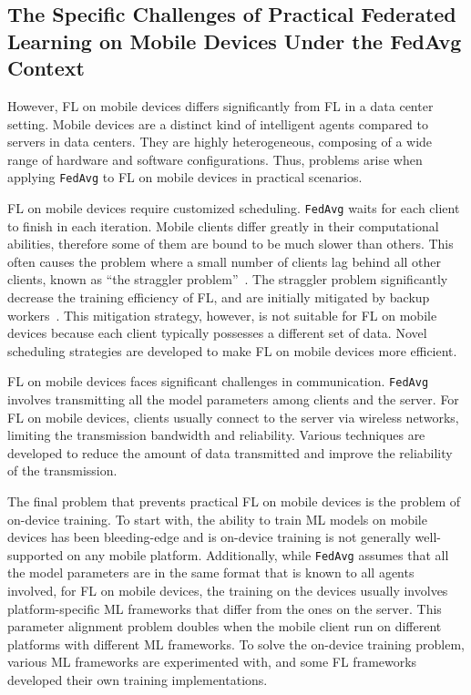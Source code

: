 \documentclass[conference]{IEEEtran}
\begin{document}
\subsection{The Specific Challenges of Practical Federated Learning on
Mobile Devices Under the FedAvg Context}

However, FL on mobile devices differs significantly from
FL in a data center setting.
Mobile devices are a distinct kind of intelligent agents compared to
servers in data centers.
They are highly heterogeneous,
composing of a wide range of hardware and software configurations.
Thus, problems arise when applying \verb|FedAvg| to FL on mobile devices in
practical scenarios.

FL on mobile devices require customized scheduling.
\verb|FedAvg| waits for each client to finish in each iteration.
Mobile clients differ greatly in their computational abilities,
therefore some of them are bound to be much slower than others.
This often causes the problem where
a small number of clients lag behind all other clients,
known as
``the straggler problem''~\cite{chen2020asynchronous,zheng2017asynchronous}.
The straggler problem significantly decrease the training efficiency of FL,
and are initially mitigated by backup workers~\cite{chen2016revisiting}.
This mitigation strategy, however,
is not suitable for FL on mobile devices because
each client typically possesses a different set of data.
Novel scheduling strategies are developed to
make FL on mobile devices more efficient.

FL on mobile devices faces significant challenges in communication.
\verb|FedAvg| involves transmitting all the model parameters among
clients and the server.
For FL on mobile devices,
clients usually connect to the server via wireless networks,
limiting the transmission bandwidth and reliability.
Various techniques are developed to reduce the amount of data transmitted
and improve the reliability of the transmission.

The final problem that prevents practical FL on mobile devices is
the problem of on-device training.
To start with, the ability to train ML models on mobile devices has been
bleeding-edge and
is on-device training is not generally well-supported on any mobile platform.
Additionally,
while \verb|FedAvg| assumes that all the model parameters are
in the same format that is known to all agents involved,
for FL on mobile devices,
the training on the devices usually involves platform-specific ML frameworks
that differ from the ones on the server.
This parameter alignment problem doubles when
the mobile client run on different platforms with
different ML frameworks.
To solve the on-device training problem,
various ML frameworks are experimented with,
and some FL frameworks developed their own training implementations.
\end{document}
